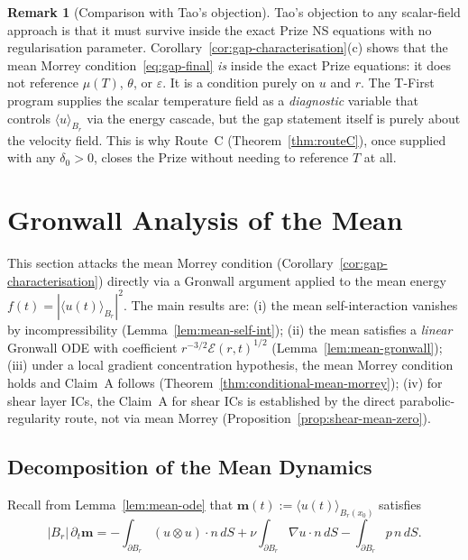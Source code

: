 \documentclass[11pt]{article}
\theoremstyle{definition}
\newtheorem{remark}[theorem]{Remark}
\theoremstyle{remark}
\begin{document}
\begin{remark}[Comparison with Tao's objection]
\label{rem:tao-comparison}
  Tao's objection to any scalar-field approach is that it must survive inside the
  exact Prize NS equations with no regularisation parameter.
  Corollary~\ref{cor:gap-characterisation}(c) shows that the mean Morrey condition~\eqref{eq:gap-final}
  \emph{is} inside the exact Prize equations: it does not reference $\mu(T)$, $\theta$, or $\varepsilon$.
  It is a condition purely on $u$ and $r$.  The T-First program supplies the scalar
  temperature field as a \emph{diagnostic} variable that controls $\langle u\rangle_{B_r}$
  via the energy cascade, but the gap statement itself is purely about the velocity field.
  This is why Route~C (Theorem~\ref{thm:routeC}), once supplied with any $\delta_0>0$,
  closes the Prize without needing to reference $T$ at all.
\end{remark}

\section{Gronwall Analysis of the Mean}
\label{sec:gronwall-mean}

This section attacks the mean Morrey condition
(Corollary~\ref{cor:gap-characterisation}) directly via a Gronwall
argument applied to the mean energy $f(t)=|\langle u(t)\rangle_{B_r}|^2$.
The main results are: (i) the mean self-interaction vanishes by
incompressibility (Lemma~\ref{lem:mean-self-int}); (ii) the mean satisfies
a \emph{linear} Gronwall ODE with coefficient $r^{-3/2}\mathcal{E}(r,t)^{1/2}$
(Lemma~\ref{lem:mean-gronwall}); (iii) under a local gradient concentration
hypothesis, the mean Morrey condition holds and Claim~A follows
(Theorem~\ref{thm:conditional-mean-morrey}); (iv) for shear layer ICs, the
Claim~A for shear ICs is established by the direct parabolic-regularity route,
not via mean Morrey (Proposition~\ref{prop:shear-mean-zero}).

\subsection{Decomposition of the Mean Dynamics}

Recall from Lemma~\ref{lem:mean-ode} that $\mathbf{m}(t):=\langle u(t)\rangle_{B_r(x_0)}$
satisfies
\begin{equation}\label{eq:mean-ode-recall}
  |B_r|\,\partial_t\mathbf{m}
  = -\int_{\partial B_r}\!(u\otimes u)\cdot n\,dS
    + \nu\int_{\partial B_r}\!\nabla u\cdot n\,dS
    - \int_{\partial B_r}\!p\,n\,dS.
\end{equation}
\end{document}
